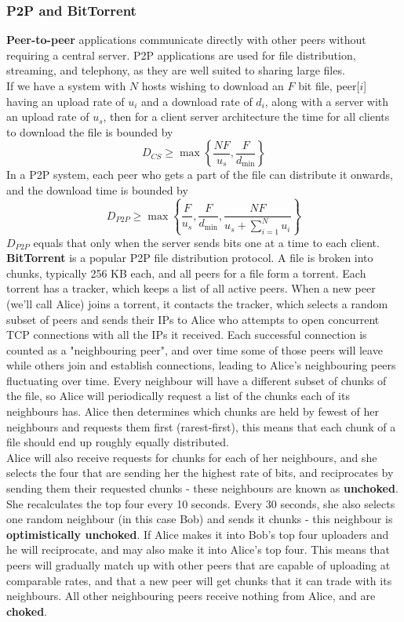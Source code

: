 \subsubsection{P2P and BitTorrent}
\textbf{Peer-to-peer} applications communicate directly with other peers without requiring a central server. P2P applications are used for file distribution, streaming, and telephony, as they are well suited to sharing large files.\\
If we have a system with $N$ hosts wishing to download an $F$ bit file, peer[$i$] having an upload rate of $u_i$ and a download rate of $d_i$, along with a server with an upload rate of $u_s$, then for a client server architecture the time for all clients to download the file is bounded by
\[
	D_{CS}\ge\max\left\{\frac{NF}{u_s},\frac{F}{d_{\min}}\right\}
\]
In a P2P system, each peer who gets a part of the file can distribute it onwards, and the download time is bounded by
\[
	D_{P2P}\ge\max\left\{\frac{F}{u_s},\frac{F}{d_{\min}},\frac{NF}{u_s+\sum^N_{i=1}u_i}\right\}
\]
$D_{P2P}$ equals that only when the server sends bits one at a time to each client.\\
\textbf{BitTorrent} is a popular P2P file distribution protocol. A file is broken into chunks, typically 256 KB each, and all peers for a file form a torrent. Each torrent has a tracker, which keeps a list of all active peers. When a new peer (we'll call Alice) joins a torrent, it contacts the tracker, which selects a random subset of peers and sends their IPs to Alice who attempts to open concurrent TCP connections with all the IPs it received. Each successful connection is counted as a "neighbouring peer", and over time some of those peers will leave while others join and establish connections, leading to Alice's neighbouring peers fluctuating over time. Every neighbour will have a different subset of chunks of the file, so Alice will periodically request a list of the chunks each of its neighbours has. Alice then determines which chunks are held by fewest of her neighbours and requests them first (rarest-first), this means that each chunk of a file should end up roughly equally distributed.\\
Alice will also receive requests for chunks for each of her neighbours, and she selects the four that are sending her the highest rate of bits, and reciprocates by sending them their requested chunks - these neighbours are known as \textbf{unchoked}. She recalculates the top four every 10 seconds. Every 30 seconds, she also selects one random neighbour (in this case Bob) and sends it chunks - this neighbour is \textbf{optimistically unchoked}. If Alice makes it into Bob's top four uploaders and he will reciprocate, and may also make it into Alice's top four. This means that peers will gradually match up with other peers that are capable of uploading at comparable rates, and that a new peer will get chunks that it can trade with its neighbours. All other neighbouring peers receive nothing from Alice, and are \textbf{choked}.

